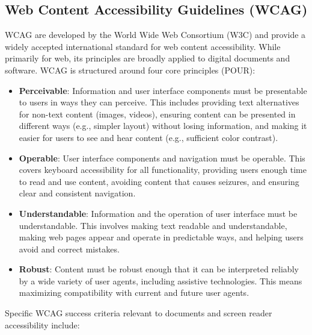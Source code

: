 \subsection{Web Content Accessibility Guidelines (WCAG)}
\label{subsec:wcag}
WCAG \cite{WCAGGuidelines} are developed by the World Wide Web Consortium (W3C) and provide a widely accepted international standard for web content accessibility. While primarily for web, its principles are broadly applied to digital documents and software. WCAG is structured around four core principles (POUR):
\begin{itemize}
    \item \textbf{Perceivable}: Information and user interface components must be presentable to users in ways they can perceive. This includes providing text alternatives for non-text content (images, videos), ensuring content can be presented in different ways (e.g., simpler layout) without losing information, and making it easier for users to see and hear content (e.g., sufficient color contrast).

    \item \textbf{Operable}: User interface components and navigation must be operable. This covers keyboard accessibility for all functionality, providing users enough time to read and use content, avoiding content that causes seizures, and ensuring clear and consistent navigation.

    \item \textbf{Understandable}: Information and the operation of user interface must be understandable. This involves making text readable and understandable, making web pages appear and operate in predictable ways, and helping users avoid and correct mistakes.

    \item \textbf{Robust}: Content must be robust enough that it can be interpreted reliably by a wide variety of user agents, including assistive technologies. This means maximizing compatibility with current and future user agents.

\end{itemize}
Specific WCAG success criteria relevant to documents and screen reader accessibility include:
